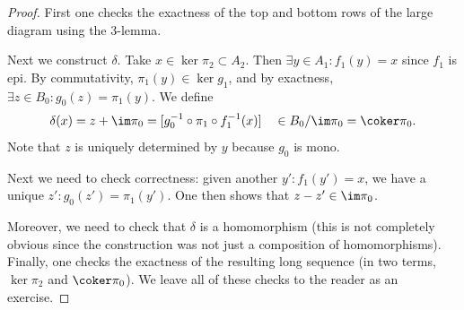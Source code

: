 \begin{lem}
\end{lem}
\begin{proof}
    First one checks the exactness of the top and bottom rows of the large diagram using the 3-lemma.
    
    Next we construct $\delta$. Take $x\in \ker\pi_2\subset A_2$. Then $\exists y\in A_1:f_1(y)=x$ since $f_1$ is epi. By commutativity, $\pi_1(y)\in\ker g_1$, and by exactness, $\exists z\in B_0:g_0(z)=\pi_1(y)$. We define
    \[\delta(x)=z+\im \pi_0=[g_0^{-1}\circ\pi_1\circ f_1^{-1}(x)]\quad \in B_0/\im\pi_0=\coker\pi_0.\]
    Note that $z$ is uniquely determined by $y$ because $g_0$ is mono.
    
    Next we need to check correctness: given another $y': f_1(y')=x$, we have a unique $z':g_0(z')=\pi_1(y')$. One then shows that $z-z'\in \im\pi_0$.
    
    Moreover, we need to check that $\delta$ is a homomorphism (this is not completely obvious since the construction was not just a composition of homomorphisms). Finally, one checks the exactness of the resulting long sequence (in two terms, $\ker\pi_2$ and $\coker\pi_0$). We leave all of these checks to the reader as an exercise.
\end{proof}


